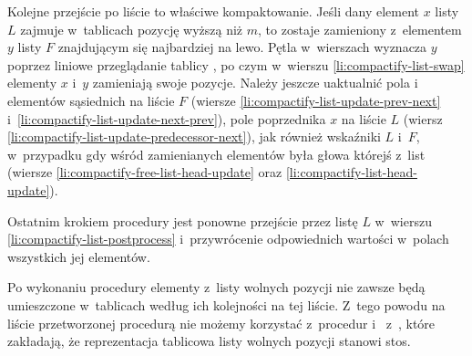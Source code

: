 Kolejne przejście po liście to właściwe kompaktowanie.
Jeśli dany element $x$ listy $L$ zajmuje w~tablicach pozycję wyższą niż $m$, to zostaje zamieniony z~elementem $y$ listy $F$ znajdującym się najbardziej na lewo.
Pętla  w~wierszach \doubledash{\ref{li:compactify-list-while2-begin}}{\ref{li:compactify-list-while2-end}} wyznacza $y$ poprzez liniowe przeglądanie tablicy , po czym w~wierszu \ref{li:compactify-list-swap} elementy $x$ i~$y$ zamieniają swoje pozycje.
Należy jeszcze uaktualnić pola  i~ elementów sąsiednich na liście $F$ (wiersze \ref{li:compactify-list-update-prev-next} i~\ref{li:compactify-list-update-next-prev}), pole  poprzednika $x$ na liście $L$ (wiersz \ref{li:compactify-list-update-predecessor-next}), jak również wskaźniki $L$ i~$F$, w~przypadku gdy wśród zamienianych elementów była głowa którejś z~list (wiersze \ref{li:compactify-free-list-head-update} oraz \ref{li:compactify-list-head-update}).

Ostatnim krokiem procedury jest ponowne przejście przez listę $L$ w~wierszu \ref{li:compactify-list-postprocess} i~przywrócenie odpowiednich wartości w~polach  wszystkich jej elementów.

Po wykonaniu procedury elementy z~listy wolnych pozycji nie zawsze będą umieszczone w~tablicach według ich kolejności na tej liście.
Z~tego powodu na liście przetworzonej procedurą  nie możemy korzystać z~procedur  i~ z~, które zakładają, że reprezentacja tablicowa listy wolnych pozycji stanowi stos.
